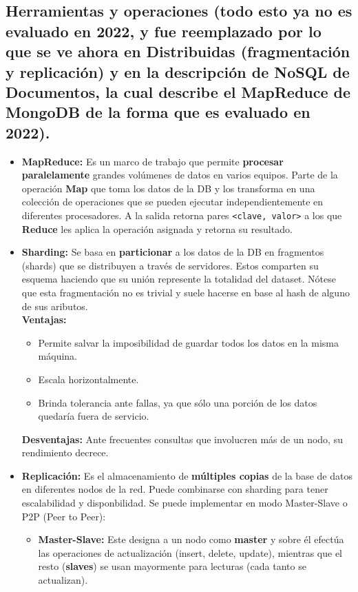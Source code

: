 \subsection*{Herramientas y operaciones (todo esto ya no es evaluado en 2022, y fue reemplazado por lo que se ve ahora en Distribuidas (fragmentación y replicación) y en la descripción de NoSQL de Documentos, la cual describe el MapReduce de MongoDB de la forma que es evaluado en 2022).}
\begin{itemize}
    \item \textbf{MapReduce:} Es un marco de trabajo que permite \textbf{procesar paralelamente} grandes volúmenes de datos en varios equipos. Parte de la operación \textbf{Map} que toma los datos de la DB y los transforma en una colección de operaciones que se pueden ejecutar independientemente en diferentes procesadores. A la salida retorna pares \texttt{<clave, valor>} a los que \textbf{Reduce} les aplica la operación asignada y retorna su resultado.
    \item \textbf{Sharding:} Se basa en \textbf{particionar} a los datos de la DB en fragmentos (shards) que se distribuyen a través de servidores. Estos comparten su esquema haciendo que su unión represente la totalidad del dataset. Nótese que esta fragmentación no es trivial y suele hacerse en base al hash de alguno de sus aributos. \\
    \textbf{Ventajas:}
    \begin{itemize}
        \item Permite salvar la imposibilidad de guardar todos los datos en la misma máquina.
        \item Escala horizontalmente.
        \item Brinda tolerancia ante fallas, ya que sólo una porción de los datos quedaría fuera de servicio.
    \end{itemize}
    \textbf{Desventajas:} Ante frecuentes consultas que involucren más de un nodo, su rendimiento decrece.
    \item \textbf{Replicación:} Es el almacenamiento de \textbf{múltiples copias} de la base de datos en diferentes nodos de la red. Puede combinarse con sharding para tener escalabilidad y disponbilidad. Se puede implementar en modo Master-Slave o P2P (Peer to Peer):
    \begin{itemize}
        \item \textbf{Master-Slave:} Este designa a un nodo como \textbf{master} y sobre él efectúa las operaciones de actualización (insert, delete, update), mientras que el resto (\textbf{slaves}) se usan mayormente para lecturas (cada tanto se actualizan). \\

\end{itemize}
\end{itemize}
